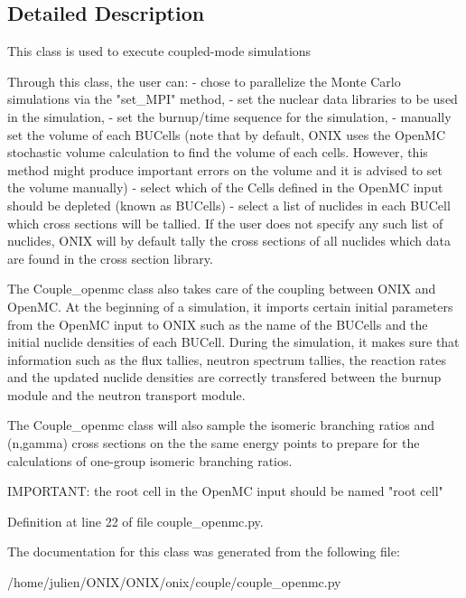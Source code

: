 \subsection{Detailed Description}
\begin{DoxyVerb}This class is used to execute coupled-mode simulations

Through this class, the user can:
- chose to parallelize the Monte Carlo simulations
via the "set_MPI" method,
- set the nuclear data libraries to be used in the simulation,
- set the burnup/time sequence for the simulation,
- manually set the volume of each BUCells (note that by default, ONIX uses the OpenMC stochastic volume calculation
to find the volume of each cells. However, this method might produce important errors on the volume and it is
advised to set the volume manually)
- select which of the Cells defined in the OpenMC input should be depleted (known as BUCells)
- select a list of nuclides in each BUCell which cross sections will be tallied. If the user 
does not specify any such list of nuclides, ONIX will by default tally the cross sections of all
nuclides which data are found in the cross section library.

The Couple_openmc class also takes care of the coupling between ONIX and OpenMC. At the beginning of a simulation,
it imports certain initial parameters from the OpenMC input to ONIX such as the name of the BUCells and the initial
nuclide densities of each BUCell. During the simulation, it makes sure that information such as the flux tallies,
neutron spectrum tallies, the reaction rates and the updated nuclide densities are correctly transfered between the burnup
module and the neutron transport module.

The Couple_openmc class will also sample the isomeric branching ratios and (n,gamma) cross sections on the
the same energy points to prepare for the calculations of one-group isomeric branching ratios.

IMPORTANT: the root cell in the OpenMC input should be named "root cell" \end{DoxyVerb}
 

Definition at line 22 of file couple\+\_\+openmc.\+py.



The documentation for this class was generated from the following file\+:\begin{DoxyCompactItemize}
\item 
/home/julien/\+O\+N\+I\+X/\+O\+N\+I\+X/onix/couple/couple\+\_\+openmc.\+py\end{DoxyCompactItemize}
